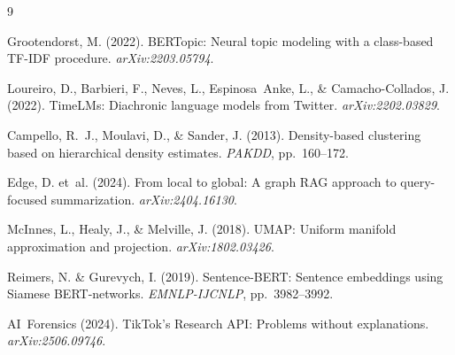 \documentclass[12pt, a4paper]{article}
\begin{document}
\begin{thebibliography}{9}

Grootendorst, M. (2022).
BERTopic: Neural topic modeling with a class-based TF-IDF procedure.
\textit{arXiv:2203.05794}.

Loureiro, D., Barbieri, F., Neves, L., Espinosa~Anke, L., \& Camacho-Collados, J. (2022).
TimeLMs: Diachronic language models from Twitter.
\textit{arXiv:2202.03829}.

Campello, R.~J., Moulavi, D., \& Sander, J. (2013).
Density-based clustering based on hierarchical density estimates.
\textit{PAKDD}, pp.~160--172.

Edge, D. et~al. (2024).
From local to global: A graph RAG approach to query-focused summarization.
\textit{arXiv:2404.16130}.

McInnes, L., Healy, J., \& Melville, J. (2018).
UMAP: Uniform manifold approximation and projection.
\textit{arXiv:1802.03426}.

Reimers, N. \& Gurevych, I. (2019).
Sentence-BERT: Sentence embeddings using Siamese BERT-networks.
\textit{EMNLP-IJCNLP}, pp.~3982--3992.

AI~Forensics (2024).
TikTok's Research API: Problems without explanations.
\textit{arXiv:2506.09746}.

\end{thebibliography}
\end{document}
